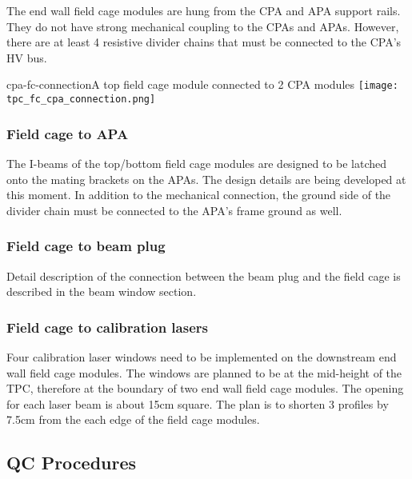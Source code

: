 The end wall field cage modules are hung from the CPA and APA support rails.  They do not have strong mechanical coupling to the CPAs and APAs. However, there are at least 4 resistive divider chains that must be connected to the CPA's HV bus.

\begin{cdrfigure}{cpa-fc-connection}{A top field cage module connected to 2 CPA modules}
\texttt{[image: tpc\_fc\_cpa\_connection.png]}
\end{cdrfigure}


\subsubsection{Field cage to APA}

The I-beams of the top/bottom field cage modules are designed to be latched onto the mating brackets on the APAs.  The design details are being developed at this moment.  In addition to the mechanical connection, the ground side of the divider chain must be connected to the APA's frame ground as well.


\subsubsection{Field cage to beam plug}

Detail description of the connection between the beam plug and the field cage is described in the beam window section.



\subsubsection{Field cage to calibration lasers}

Four calibration laser windows need to be implemented on the downstream end wall field cage modules.  The windows are planned to be at the mid-height of the TPC, therefore at the boundary of two end wall field cage modules.  The opening for each laser beam is about 15cm square.  The plan is to shorten 3 profiles by 7.5cm from the each edge of the field cage modules.



\subsection{QC Procedures}

 


